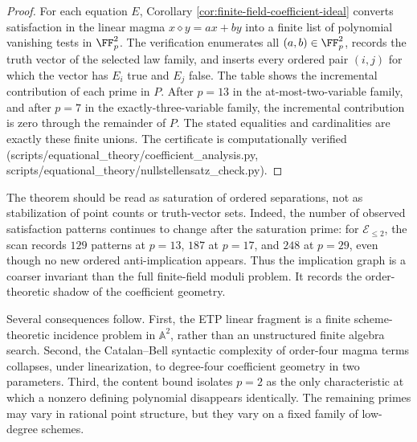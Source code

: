 \begin{proof}
For each equation \(E\), Corollary
\ref{cor:finite-field-coefficient-ideal} converts satisfaction in the linear
magma \(x\diamond y=ax+by\) into a finite list of polynomial vanishing tests in
\(\FF_p^2\).  The verification enumerates all \((a,b)\in\FF_p^2\), records the
truth vector of the selected law family, and inserts every ordered pair
\((i,j)\) for which the vector has \(E_i\) true and \(E_j\) false.  The table
shows the incremental contribution of each prime in \(P\).  After \(p=13\) in
the at-most-two-variable family, and after \(p=7\) in the exactly-three-variable
family, the incremental contribution is zero through the remainder of \(P\).
The stated equalities and cardinalities are exactly these finite unions.  The
certificate is computationally verified (scripts/equational\_theory/coefficient\_analysis.py, scripts/equational\_theory/nullstellensatz\_check.py).
\end{proof}

The theorem should be read as saturation of ordered separations, not as
stabilization of point counts or truth-vector sets.  Indeed, the number of
observed satisfaction patterns continues to change after the saturation prime:
for \({\mathcal E}_{\leq2}\), the scan records \(129\) patterns at \(p=13\),
\(187\) at \(p=17\), and \(248\) at \(p=29\), even though no new ordered
anti-implication appears.  Thus the implication graph is a coarser invariant
than the full finite-field moduli problem.  It records the order-theoretic
shadow of the coefficient geometry.

Several consequences follow.  First, the ETP linear fragment is a finite
scheme-theoretic incidence problem in \(\mathbb A^2\), rather than an
unstructured finite algebra search.  Second, the Catalan--Bell syntactic
complexity of order-four magma terms collapses, under linearization, to
degree-four coefficient geometry in two parameters.  Third, the content bound
isolates \(p=2\) as the only characteristic at which a nonzero defining
polynomial disappears identically.  The remaining primes may vary in rational
point structure, but they vary on a fixed family of low-degree schemes.
